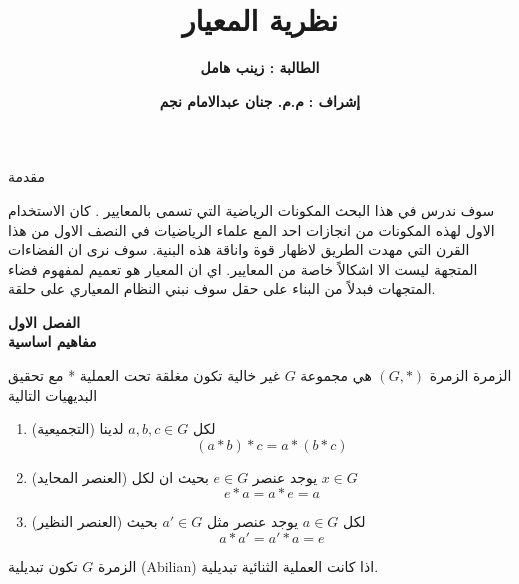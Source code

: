 

\title{\textbf{نظرية المعيار}\\
\textbf{}}
\author{\textbf{الطالبة : زينب هامل}}
\date{\textbf{إشراف :}
		\textbf{م.م. جنان عبدالامام نجم}}

	\abovedisplayskip=7pt
	\belowdisplayskip=7pt
	\maketitle
	\timesfont
	\begin{frame}{مقدمة}
		
		\pause
			سوف ندرس في هذا البحث المكونات الرياضية التي تسمى بالمعايير . كان الاستخدام الاول لهذه المكونات من انجازات احد المع علماء الرياضيات في النصف الاول من هذا القرن
		 التي مهدت الطريق لاظهار قوة واناقة هذه البنية. سوف نرى ان الفضاءات المتجهة ليست الا اشكالاً خاصة من المعايير. اي ان المعيار هو تعميم لمفهوم فضاء المتجهات فبدلاً من البناء على حقل سوف نبني النظام المعياري على حلقة. 
	\end{frame}
	
	\begin{frame}
		\begin{center}
			\Huge
			\textbf{الفصل الاول}\\
			\textbf{مفاهيم اساسية}
		\end{center}
	\end{frame}
	
	\begin{frame}
		
		\pause
		\begin{exampleblock}{الزمرة}
			الزمرة $(G, *)$ هي مجموعة $G$ غير خالية تكون مغلقة تحت العملية * مع تحقيق البديهيات التالية
			\begin{enumerate}
				\item (التجميعية) لكل $a, b, c\in G$ لدينا
				\[
				(a*b) * c = a*(b*c)
				\]
				\item (العنصر المحايد) يوجد عنصر $e\in G$ بحيث ان لكل $x\in G$ 
				\[
				e * a = a * e = a
				\]
				\item (العنصر النظير)  لكل $a\in G$ يوجد عنصر مثل $a' \in G$ بحيث 
				\[
				a * a' = a' * a = e
				\]
			\end{enumerate}
		\end{exampleblock}
		
		\pause
		\begin{exampleblock}{}
			الزمرة $G$ تكون تبديلية (Abilian) اذا كانت العملية الثنائية تبديلية.
		\end{exampleblock}
	\end{frame}
	

